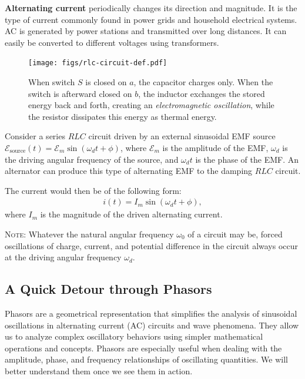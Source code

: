\documentclass[12pt,b4paper]{article}
\begin{document}
\textbf{Alternating current} periodically changes its direction and magnitude. It is the type of current commonly found in power grids and household electrical systems. AC is generated by power stations and transmitted over long distances. It can easily be converted to different voltages using transformers.
\begin{figure}[H]
    \centering
    \texttt{[image: figs/rlc-circuit-def.pdf]}
    \caption{When switch $S$ is closed on $a$, the capacitor charges only. When the switch is afterward closed on $b$, the inductor exchanges the stored energy back and forth, creating an \textit{electromagnetic oscillation}, while the resistor dissipates this energy as thermal energy.}
    \label{fig:rlc-circuit-def}
\end{figure}
Consider a series $RLC$ circuit driven by an external sinusoidal EMF source $\mathcal{E}_\text{source}(t)=\mathcal{E}_m\sin(\omega_d t+\phi)$, where $\mathcal{E}_m$ is the amplitude of the EMF, $\omega_d$ is the driving angular frequency of the source, and $\omega_dt$ is the phase of the EMF. An alternator can produce this type of alternating EMF to the damping $RLC$ circuit.

The current would then be of the following form:
\begin{align}
    i(t)=I_m\sin(\omega_d t+\phi),
\end{align}
where $I_m$ is the magnitude of the driven alternating current.

\textsc{Note}: Whatever the natural angular frequency $\omega_0$ of a circuit may be, forced oscillations of charge, current, and potential difference in the circuit always occur at the driving angular frequency $\omega_d$.
\subsection{A Quick Detour through Phasors}
Phasors are a geometrical representation that simplifies the analysis of sinusoidal oscillations in alternating current (AC) circuits and wave phenomena. They allow us to analyze complex oscillatory behaviors using simpler mathematical operations and concepts. Phasors are especially useful when dealing with the amplitude, phase, and frequency relationships of oscillating quantities. We will better understand them once we see them in action.
\end{document}
